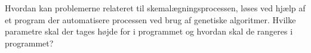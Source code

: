 Hvordan kan problemerne relateret til skemalægningsprocessen, løses ved hjælp af et program der automatisere processen ved brug af genetiske algoritmer. Hvilke parametre skal der tages højde for i programmet og hvordan skal de rangeres i programmet?
\newpage